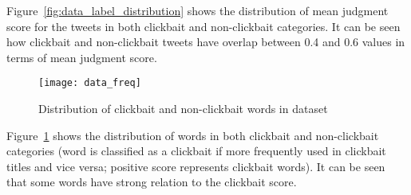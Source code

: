 Figure~\ref{fig:data_label_distribution} shows the distribution of mean judgment score for the tweets in both clickbait and non-clickbait categories. It can be seen how clickbait and non-clickbait tweets have overlap between 0.4 and 0.6 values in terms of mean judgment score.

\begin{figure}[H]
    \centering
    \texttt{[image: data\_freq]}
    \caption{Distribution of clickbait and non-clickbait words in dataset}
    \label{fig:data_freq}
\end{figure}

Figure~\ref{fig:data_freq} shows the distribution of words in both clickbait and non-clickbait categories (word is classified as a clickbait if more frequently used in clickbait titles and vice versa; positive score represents clickbait words). It can be seen that some words have strong relation to the clickbait score.